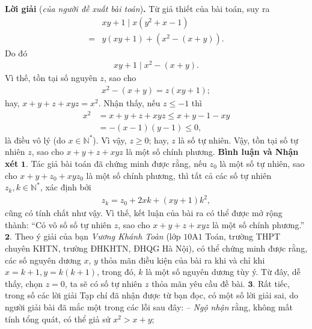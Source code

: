 \begin{multicols}{2}
	\vskip 0.05cm
	\textbf{\color{thachthuctoanhoc}Lời giải} (\textit{của người đề xuất bài toán})\textbf{\color{thachthuctoanhoc}.}
	\vskip 0.05cm
	Từ giả thiết của bài toán, suy ra
	\begin{align*}
		&{xy + 1} \mid x\left( {{y^2} + x - 1} \right) \\
		= &y\left( {xy + 1} \right) + \left( {{x^2} - \left( {x + y} \right)} \right).
	\end{align*}
	Do đó
	\begin{align*}
		 {xy + 1} \mid {x^2} - \left( {x + y} \right).
	\end{align*}
	Vì thế, tồn tại số nguyên $z$, sao cho
	\begin{align*}
		{x^2} - \left( {x + y} \right) = z\left( {xy + 1} \right);
	\end{align*}
	hay, $x + y + z + xyz = {x^2}.$
	\vskip 0.05cm  
	Nhận thấy, nếu $z \le -1$  thì
	\begin{align*}
		{x^2} &= x + y + z + xyz \le x + y - 1 - xy \\
		&= - \left( {x - 1} \right)\left( {y - 1} \right) \le 0,
	\end{align*}
	là điều vô lý (do  $x \in \mathbb{N^*}$).
	\vskip 0.05cm
	Vì vậy, $z \ge 0$; hay, $z$ là số tự nhiên.
	\vskip 0.05cm
	Vậy, tồn tại số tự nhiên $z$, sao cho $x + y + z + xyz$ là một số chính phương.
	\vskip 0.05cm
	\textbf{\color{thachthuctoanhoc}Bình luận và Nhận xét}
	\vskip 0.05cm
	$\pmb{1.}$ Tác giả bài toán đã chứng minh được rằng, nếu $z_0$  là một số tự nhiên, sao cho $x + y + z_0 + xyz_0$  là một số chính phương, thì tất cả các số tự nhiên $z_k, k \in \mathbb{N^*}$, xác định bởi
	\begin{align*}
		{z_k} = {z_0} + 2xk + \left( {xy + 1} \right){k^2},
	\end{align*}
	cũng có tính chất như vậy. Vì thế, kết luận của bài ra có thể được mở rộng thành: “Có vô số số tự nhiên $z$, sao cho $x + y + z + xyz$ là một số chính phương.”
	\vskip 0.05cm
	$\pmb{2.}$ Theo ý giải của bạn \textit{Vương Khánh Toàn} (lớp $10$A$1$ Toán, trường THPT chuyên KHTN, trường ĐHKHTN, ĐHQG Hà Nội), có thể chứng minh được rằng, các số nguyên dương $x$, $y$ thỏa mãn điều kiện của bài ra khi và chỉ khi $x = k + 1, y = k(k + 1)$, trong đó, $k$ là một số nguyên dương tùy ý. Từ đây, dễ thấy, chọn $z = 0$, ta sẽ có số tự nhiên $z$ thỏa mãn yêu cầu đề bài.
	\vskip 0.05cm
	$\pmb{3.}$ Rất tiếc, trong số các lời giải Tạp chí đã nhận được từ bạn đọc, có một số lời giải sai, do người giải bài đã mắc một trong các lỗi sau đây:
	\vskip 0.05cm
	-- \textit{Ngộ nhận} rằng, không mất tính tổng quát, có thể giả sử $x^2 > x + y$;

\end{multicols}
